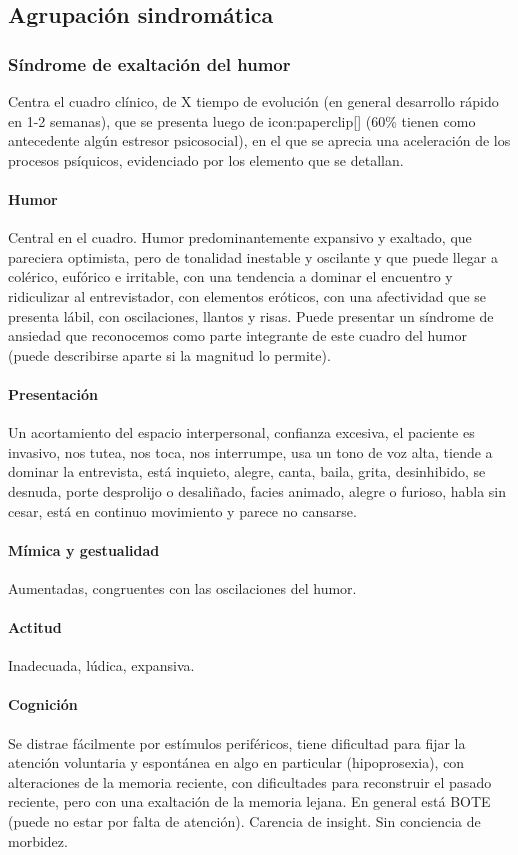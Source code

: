 \documentclass{scrbook}
\begin{document}
\subsection*{Agrupación sindromática}
\subsubsection*{Síndrome de exaltación del humor}
Centra el cuadro clínico, de X tiempo de evolución (en general desarrollo rápido en 1-2 semanas), que se presenta luego de icon:paperclip[] (60\% tienen como antecedente algún estresor psicosocial), en el que se aprecia una aceleración de los procesos psíquicos, evidenciado por los elemento que se detallan.
\paragraph{Humor}
Central en el cuadro. Humor predominantemente expansivo y exaltado, que pareciera optimista, pero de tonalidad inestable y oscilante y que puede llegar a colérico, eufórico e irritable, con una tendencia a dominar el encuentro y ridiculizar al entrevistador, con elementos eróticos, con una afectividad que se presenta lábil, con oscilaciones, llantos y risas. Puede presentar un síndrome de ansiedad que reconocemos como parte integrante de este cuadro del humor (puede describirse aparte si la magnitud lo permite).
\paragraph{Presentación}
Un acortamiento del espacio interpersonal, confianza excesiva, el paciente es invasivo, nos tutea, nos toca, nos interrumpe, usa un tono de voz alta, tiende a dominar la entrevista, está inquieto, alegre, canta, baila, grita, desinhibido, se desnuda, porte desprolijo o desaliñado, facies animado, alegre o furioso, habla sin cesar, está en continuo movimiento y parece no cansarse.
\paragraph{Mímica y gestualidad}
Aumentadas, congruentes con las oscilaciones del humor.
\paragraph{Actitud}
Inadecuada, lúdica, expansiva.
\paragraph{Cognición}
Se distrae fácilmente por estímulos periféricos, tiene dificultad para fijar la atención voluntaria y espontánea en algo en particular (hipoprosexia), con alteraciones de la memoria reciente, con dificultades para reconstruir el pasado reciente, pero con una exaltación de la memoria lejana. En general está BOTE (puede no estar por falta de atención). Carencia de insight. Sin conciencia de morbidez.
\end{document}
